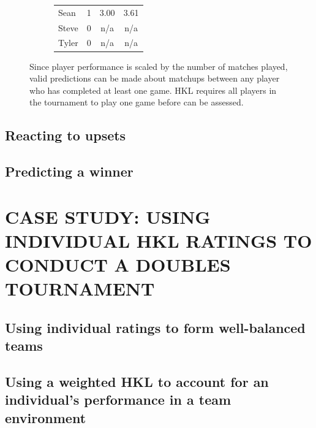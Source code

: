 \documentclass[letterpaper, 10 pt, conference]{ieeeconf}  %
\begin{document}
\begin{figure}[hb]
\begin{subfigure}[h]{0.4\textwidth}
\begin{tabular}{lccc}
                        Sean	& 1	& 3.00	& 3.61 \\
                        Steve	& 0	& n/a	& n/a  \\
                        Tyler	& 0	& n/a	& n/a  \\
                        \bottomrule
                \end{tabular}
        \end{subfigure}
        \caption{Since player performance is scaled by the number of matches played,
                valid predictions can be made about matchups between any player who
                has completed at least one game. HKL requires all players in the 
                tournament to play one game before can be assessed.}
\end{figure}

\subsection{Reacting to upsets}

\subsection{Predicting a winner}

\section{CASE STUDY: USING INDIVIDUAL HKL RATINGS TO CONDUCT A DOUBLES TOURNAMENT}

\subsection{Using individual ratings to form well-balanced teams}
\subsection{Using a weighted HKL to account for an individual's performance in a team environment} 
\end{document}
